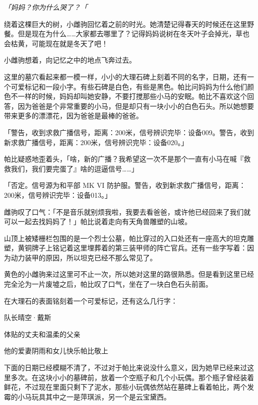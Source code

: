 \emph{「妈妈？你为什么哭了？「}

绕着这棵巨大的树，小雌驹回忆着之前的时光。她清楚记得春天的时候还在这里野餐。但是现在为什么……大家都去哪里了？记得妈妈说树在冬天叶子会掉光，草也会枯黄，可能现在就是冬天了吧！

小雌驹想着，向记忆之中的地点飞奔过去。

\horizonline


这里的墓穴看起来都一模一样，小小的大理石碑上刻着不同的名字，日期，还有一个可爱标记和一段小字。有些石碑是白色，有些是黑色。帕比问妈妈为什么他们颜色不一样的时候，妈妈却叫她安静，不要打搅那些小马的安眠。帕比不喜欢这个回答，因为爸爸是个非常重要的小马，但是却只有一块小小的白色石头。所以她想要带来更多的漂漂花，因为爸爸是最棒的爸爸。

「{\mt 警告，收到求救广播信号，距离：200米，信号辨识完毕：设备009。警告，收到新求救广播信号，距离：200米，信号辨识完毕：设备020。}」

帕比疑惑地歪着头，「啥，新的广播？我希望这一次不是那个一直有小马在喊『救救我们，我们要完蛋了』啥的逗逼信号……」

「{\mt 否定。信号源为和平部 MK VI 防护服。警告，收到新求救广播信号，距离：200米，信号辨识完毕：设备013。}」

雌驹叹了口气：「不是音乐就别烦我啦，我要去看爸爸，或许他已经回来了我们就可以一起去找妈妈了！」帕比说着走向有天角兽雕塑的山坡。

山顶上被矮栅栏包围的是一个烈士公墓，帕比穿过的入口处还有一座高大的坦克雕塑，黄铜牌子上铭记着这里埋葬着的第三装甲师的阵亡官兵。还有一些字写着：因为动力装甲的原因，所以坦克已经不那么常见了。

黄色的小雌驹来过这里可不止一次，所以她对这里的路很熟悉。但是看到这里已经完全沦为一片废墟之后，帕比叹了口气，坐在了一块白色石头前面。

在大理石的表面铭刻着一个可爱标记，还有这么几行字：

\begin{center}
    队长晴空·戴斯

    体贴的丈夫和温柔的父亲
    
    他的爱妻阴雨和女儿快乐帕比敬上
\end{center}

下面的日期已经模糊不清了，不过对于帕比来说没什么意义，因为她早已经来过这里多次。在这块小小的墓碑前，放着一个空瓶子和几个小玩偶。那个瓶子曾经装着鲜花，不过现在里面只剩下了泥水，那些小玩偶依然站在墓碑上看着帕比，两个发霉的小马玩具其中之一是萍琪派，另一个是云宝黛西。

